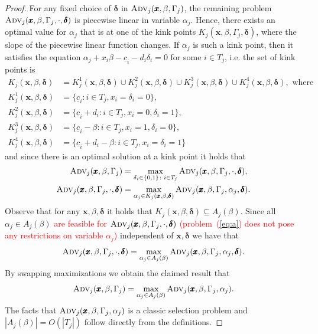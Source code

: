 \documentclass[a4paper,11pt,abstracton]{scrartcl}
\theoremstyle{definition}
\theoremstyle{remark}
\begin{document}
\begin{proof}
  For any fixed choice of $\pmb{\delta}$ in $\textsc{Adv}_j(\pmb{x},\beta,\Gamma_j)$, the remaining problem $\textsc{Adv}_j(\pmb{x},\beta,\Gamma_j, \cdot, \pmb{\delta})$ is piecewise linear in variable $\alpha_j$.
  Hence, there exists an optimal value for $\alpha_j$ that is at one of the kink points $K_j(\pmb{x}, \beta, \Gamma_j, \pmb{\delta})$, 
  where the slope of the piecewise linear function changes. 
  If $\alpha_j$ is such a kink point, then it satisfies the equation $\alpha_j + x_i \beta - \underline{c}_i - d_i\delta_i = 0$ for some $i \in T_j$,
  i.e. the set of kink points is
  \begin{align*}
  K_j(\pmb{x}, \beta, \pmb{\delta}) &= K_j^1(\pmb{x}, \beta, \pmb{\delta}) \cup K_j^2(\pmb{x}, \beta, \pmb{\delta}) \cup K_j^3(\pmb{x}, \beta, \pmb{\delta}) \cup K_j^4(\pmb{x}, \beta, \pmb{\delta}),\text{ where} \\
  K_j^1(\pmb{x}, \beta, \pmb{\delta}) &= \{\underline{c}_i \colon  i \in T_j, x_i = \delta_i = 0 \}, \\
  K_j^2(\pmb{x}, \beta, \pmb{\delta}) &= \{\underline{c}_i + d_i \colon  i \in T_j, x_i = 0, \delta_i = 1 \}, \\
  K_j^3(\pmb{x}, \beta, \pmb{\delta}) &= \{\underline{c}_i - \beta \colon i \in T_j, x_i = 1, \delta_i = 0 \}, \\
  K_j^4(\pmb{x}, \beta, \pmb{\delta}) &= \{\underline{c}_i +d_i - \beta \colon i \in T_j, x_i = \delta_i = 1 \}
  \end{align*}
  and since there is an optimal solution at a kink point it holds that
\begin{align*}
  \textsc{Adv}_j(\pmb{x},\beta,\Gamma_j) &= \max_{\delta_i \in \{0,1\} \colon i \in T_j} \textsc{Adv}_j(\pmb{x},\beta,\Gamma_j, \cdot, \pmb{\delta}),\\
   \textsc{Adv}_j(\pmb{x},\beta,\Gamma_j, \cdot, \pmb{\delta}) &= \max_{\alpha_j \in K_j(\pmb{x}, \beta, \pmb{\delta})} \textsc{Adv}_j(\pmb{x},\beta,\Gamma_j,\alpha_j, \pmb{\delta}).
\end{align*}
  Observe that for any $\pmb{x}, \beta, \pmb{\delta}$ it holds that $K_j(\pmb{x}, \beta, \pmb{\delta}) \subseteq A_j(\beta)$. 
  Since all $\alpha_j \in A_j(\beta)$ \textcolor{red}{are feasible for $\textsc{Adv}_j(\pmb{x},\beta,\Gamma_j, \cdot, \pmb{\delta})$ (problem~(\ref{eq:a}) does not pose any restrictions on variable $\alpha_j$)}
  independent of 
  $\pmb{x}, \pmb{\delta}$ we have that 
  \[ \textsc{Adv}_j(\pmb{x},\beta,\Gamma_j, \cdot, \pmb{\delta}) = \max_{\alpha_j \in A_j(\beta)} \textsc{Adv}_j(\pmb{x},\beta,\Gamma_j,\alpha_j, \pmb{\delta}). \]
  By swapping maximizations we obtain the claimed result that
  \[ \textsc{Adv}_j(\pmb{x},\beta,\Gamma_j) = \max_{\alpha_j \in A_j(\beta)} \textsc{Adv}_j(\pmb{x},\beta,\Gamma_j,\alpha_j). \]
  The facts that $\textsc{Adv}_j(\pmb{x},\beta,\Gamma_j,\alpha_j)$ is a classic selection problem and 
  $|A_j(\beta)| = O(|T_j|)$ follow directly from the definitions.
\end{proof}
\end{document}
